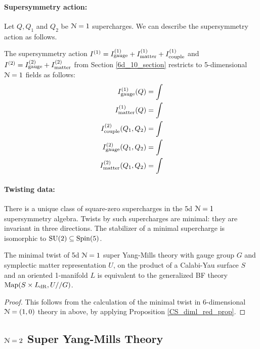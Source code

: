 \documentclass[10pt, oneside]{article}
\begin{document}
\paragraph{Supersymmetry action:} Let $Q, Q_1$ and $Q_2$ be $\mathcal{N}=1$ supercharges.  We can describe the supersymmetry action as follows.
\begin{prop}
The supersymmetry action $I^{(1)} = I^{(1)}_{\mathrm{gauge}} + I^{(1)}_{\mathrm{matter}} + I^{(1)}_{\mathrm{couple}}$ and $I^{(2)} = I^{(2)}_{\mathrm{gauge}} + I^{(2)}_{\mathrm{matter}}$ from Section \ref{6d_10_section} restricts to 5-dimensional $\mathcal{N}=1$ fields as follows:
\begin{align*}
I^{(1)}_{\mathrm{gauge}}(Q) &= \int \\
I^{(1)}_{\mathrm{matter}}(Q) &= \int \\
I^{(2)}_{\mathrm{couple}}(Q_1,Q_2) &= \int  \\
I^{(2)}_{\mathrm{gauge}}(Q_1,Q_2) &= \int \\
I^{(2)}_{\mathrm{matter}}(Q_1,Q_2) &= \int 
\end{align*}
\end{prop}

\vspace{-10pt}
\paragraph{Twisting data:}
There is a unique class of square-zero supercharges in the 5d $\mathcal{N}=1$ supersymmetry algebra.  Twists by such supercharges are minimal: they are invariant in three directions.  The stabilizer of a minimal supercharge is isomorphic to $\mathrm{SU}(2) \subseteq \mathrm{Spin}(5)$.

\begin{theorem} \label{5d_holo_twist_theorem}
The minimal twist of 5d $\mathcal{N}=1$ super Yang-Mills theory with gauge group $G$ and symplectic matter representation $U$, on the product of a Calabi-Yau surface $S$ and an oriented 1-manifold $L$ is equivalent to the generalized BF theory $\mathrm{Map}(S \times L_{\mathrm{dR}}, U//G)$.
\end{theorem}

\begin{proof}
This follows from the calculation of the minimal twist in 6-dimensional $\mathcal{N}=(1,0)$ theory in  above, by applying Proposition \ref{CS_diml_red_prop}.
\end{proof}

\subsection{$\mathcal{N} = 2$ Super Yang-Mills Theory} \label{5d_2_section}
\end{document}
